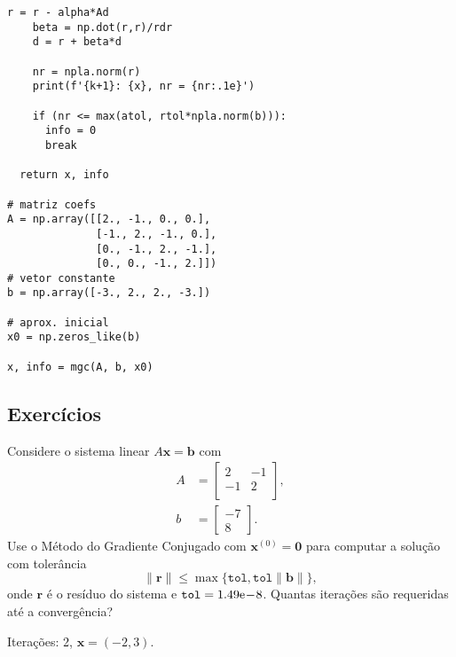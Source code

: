 \begin{ex}
\begin{lstlisting}[caption=mgc.py, label=cap_sislin_sec_metgc:cod:mgc.py]
    r = r - alpha*Ad
    beta = np.dot(r,r)/rdr
    d = r + beta*d

    nr = npla.norm(r)
    print(f'{k+1}: {x}, nr = {nr:.1e}')

    if (nr <= max(atol, rtol*npla.norm(b))):
      info = 0
      break

  return x, info
            
# matriz coefs
A = np.array([[2., -1., 0., 0.],
              [-1., 2., -1., 0.],
              [0., -1., 2., -1.],
              [0., 0., -1., 2.]])
# vetor constante
b = np.array([-3., 2., 2., -3.])

# aprox. inicial
x0 = np.zeros_like(b)

x, info = mgc(A, b, x0)
\end{lstlisting}

\end{ex}

\subsection{Exercícios}

\begin{exer}
  Considere o sistema linear $A\pmb{x} = \pmb{b}$ com
  \begin{align}
    A &=
    \begin{bmatrix}
      2 & -1\\
      -1 & 2\\
    \end{bmatrix},\\
    b &=
    \begin{bmatrix}
      -7\\
      8
    \end{bmatrix}.
  \end{align}
  Use o Método do Gradiente Conjugado com $\pmb{x}^{(0)} = \pmb{0}$ para computar a solução com tolerância
  \begin{equation}
    \|\pmb{r}\| \leq \max\{\texttt{tol}, \texttt{tol}\|\pmb{b}\|\},
  \end{equation}
  onde $\pmb{r}$ é o resíduo do sistema e $\texttt{tol} = 1.49\mathrm{e}\!-\!8$. Quantas iterações são requeridas até a convergência?
\end{exer}
\begin{resp}
  Iterações: 2, $\pmb{x} = (-2, 3)$.
\end{resp}

